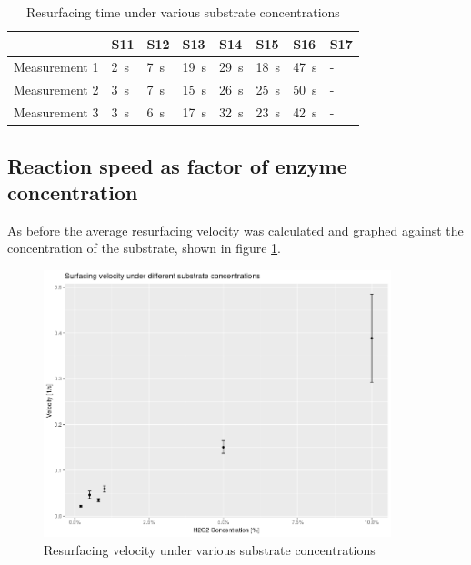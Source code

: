 \documentclass[a4paper,english]{scrreprt}
\begin{document}
\begin{table}
	\centering
	\begin{tabu}{llllllll}
		\toprule
		& S11 & S12 & S13 & S14 & S15 & S16 & S17 \\
		\midrule
		Measurement 1 & \SI{2}{\s} & \SI{7}{\s} & \SI{19}{\s} & \SI{29}{\s} & \SI{18}{\s} & \SI{47}{\s} & - \\ 
		Measurement 2 & \SI{3}{\s} & \SI{7}{\s} & \SI{15}{\s} & \SI{26}{\s} & \SI{25}{\s} & \SI{50}{\s} & - \\ 
		Measurement 3 & \SI{3}{\s} & \SI{6}{\s} & \SI{17}{\s} & \SI{32}{\s} & \SI{23}{\s} & \SI{42}{\s} & - \\ 
		\bottomrule
	\end{tabu}
	\caption{Resurfacing time under various substrate concentrations}
	\label{tbl:substrate_concentrations_time}
\end{table}

\subsection{Reaction speed as factor of enzyme concentration}

As before the average resurfacing velocity was calculated and graphed against the
concentration of the substrate, shown in figure
\ref{fig:substrate_concentration}.

\begin{figure}
	\centering
	\includegraphics[width=0.9\textwidth]{img/substrate_concentration.png}
	\caption{Resurfacing velocity under various substrate concentrations}
	\label{fig:substrate_concentration}
\end{figure}
\end{document}
